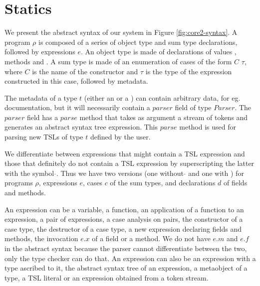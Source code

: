 \section{Statics}


We present the abstract syntax of our system in Figure \ref{fig:core2-syntax}. A program $\rho$ is composed of a series of object type  and sum type  declarations, followed by expressions $e$. An object type is made of declarations of values , methods  and . A sum type is made of an enumeration of cases of the form $C$  $\tau$, where $C$ is the name of the constructor and $\tau$ is the type of the expression constructed in this case, followed by metadata.

The metadata of a type $t$ (either an  or a ) can contain arbitrary data, for eg. documentation, but it will necessarily contain a $parser$ field of type $Parser$. The $parser$ field has a $parse$ method that takes as argument a stream of tokens and generates an abstract syntax tree expression. This $parse$ method is used for parsing new TSLs of type $t$ defined by the user. 

We differentiate between expressions that might contain a TSL expression and those that definitely do not contain a TSL expression by superscripting the latter with the symbol $\hat{}$. Thus we have two versions (one without $\hat{}$ and one with $\hat{}$) for programs $\rho$,  expressions $e$, cases $c$ of the sum types, and declarations $d$ of fields and methods. 

An expression can be a variable, a function, an application of a function to an expression, a pair of expressions, a case analysis on pairs, the constructor of a case type, the destructor of a case type, a new expression declaring fields and methods, the invocation $e.x$ of a field or a method. We do not have $e.m$ and $e.f$ in the abstract syntax because the parser cannot differentiate between the two, only the type checker can do that. An expression can also be an expression with a type ascribed to it, the abstract syntax tree of an expression, a metaobject of a type, a TSL literal or an expression obtained from a token stream. 








